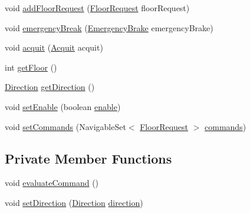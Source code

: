 \begin{DoxyCompactItemize}
\item 
void \mbox{\hyperlink{classcontrol_1_1_impl_command_control_a992b195b4521cba044f235fa35f6a9b2}{add\+Floor\+Request}} (\mbox{\hyperlink{classcontrol_1_1command_1_1_floor_request}{Floor\+Request}} floor\+Request)
\item 
void \mbox{\hyperlink{classcontrol_1_1_impl_command_control_a1a3e2202d967016c70f6c7e2105fc4c7}{emergency\+Break}} (\mbox{\hyperlink{classcontrol_1_1command_1_1_emergency_brake}{Emergency\+Brake}} emergency\+Brake)
\item 
void \mbox{\hyperlink{classcontrol_1_1_impl_command_control_a18ba4e8d7e7b6ebfec099c22f58d55d1}{acquit}} (\mbox{\hyperlink{classcontrol_1_1command_1_1_acquit}{Acquit}} acquit)
\item 
int \mbox{\hyperlink{classcontrol_1_1_impl_command_control_a03e231769f2023d9f381980a34057ad6}{get\+Floor}} ()
\item 
\mbox{\hyperlink{enumcontrol_1_1command_1_1_direction}{Direction}} \mbox{\hyperlink{classcontrol_1_1_impl_command_control_a9734880304099b72e4a65dbfe6a510a1}{get\+Direction}} ()
\item 
void \mbox{\hyperlink{classcontrol_1_1_impl_command_control_a5e4e08d530f169cec15f32d60255ac1c}{set\+Enable}} (boolean \mbox{\hyperlink{classcontrol_1_1_impl_command_control_a80ffb0738b94ae89c8b32d60f9f2fcd0}{enable}})
\item 
void \mbox{\hyperlink{classcontrol_1_1_impl_command_control_a4a32b15e589ca6ad5be4d6288f73d0d6}{set\+Commands}} (Navigable\+Set$<$ \mbox{\hyperlink{classcontrol_1_1command_1_1_floor_request}{Floor\+Request}} $>$ \mbox{\hyperlink{classcontrol_1_1_impl_command_control_afc3d3dfd36511a07dd41e717df3b13f9}{commands}})
\end{DoxyCompactItemize}
\subsection*{Private Member Functions}
\begin{DoxyCompactItemize}
\item 
void \mbox{\hyperlink{classcontrol_1_1_impl_command_control_abba34b3a552395174ddc686b4e3136dd}{evaluate\+Command}} ()
\item 
void \mbox{\hyperlink{classcontrol_1_1_impl_command_control_a122541d8e0d77a6d9ef62a1ee5391ee9}{set\+Direction}} (\mbox{\hyperlink{enumcontrol_1_1command_1_1_direction}{Direction}} \mbox{\hyperlink{classcontrol_1_1_impl_command_control_ae982796e5a99ef48f6b9db87ddb82ad7}{direction}})
\end{DoxyCompactItemize}

